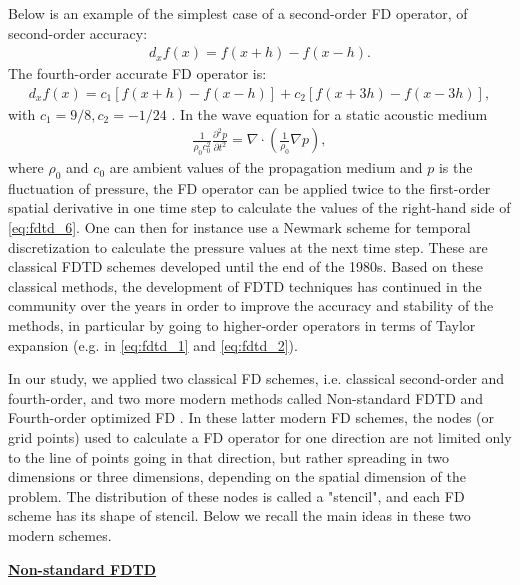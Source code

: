         Below is an example of the simplest case of a second-order FD operator, of second-order accuracy:
        \begin{align} \label{eq:fdtd_4}
             d_x f(x)=f(x+h)-f(x-h).
        \end{align}
        The fourth-order accurate FD operator is:
        \begin{align} \label{eq:fdtd_5}
             d_x f(x)=c_1 [f(x+h)-f(x-h)] + c_2 [f(x+3h)-f(x-3h)],
        \end{align}
        with $c_1=9/8, c_2=-1/24$ \parencite{Levander1988Fourthorderfinite}.
        In the wave equation for a static acoustic medium
        \begin{align} \label{eq:fdtd_6}
            \frac{1}{\rho_0 c_0^2} \frac{\partial^2 p}{\partial t^2}=\nabla \cdot (\frac{1}{\rho_0}\nabla p),
        \end{align}
        where $\rho_0$ and $c_0$ are ambient values of the propagation medium and $p$ is the fluctuation of pressure,
        the FD operator can be applied twice to the first-order spatial derivative in one time step to calculate the values of the
right-hand side of \ref{eq:fdtd_6}. One can then for instance use a Newmark scheme for temporal discretization \citep{Hug87} to calculate the pressure values at the next time step.
        These are classical FDTD schemes developed until the end of the 1980s. Based on these classical methods, the development of FDTD techniques has continued
in the community over the years in order to improve the accuracy and stability of the methods, in particular by going to higher-order operators in
terms of Taylor expansion (e.g. in \ref{eq:fdtd_1} and \ref{eq:fdtd_2}).

        In our study, we applied two classical FD schemes, i.e. classical second-order and fourth-order, and two more modern methods called Non-standard FDTD
\parencite{JafarGandomi2009NonstandardFDTD} and Fourth-order optimized FD \parencite{Bilbao2013Constructionandoptimization}. In these latter modern FD schemes,
the nodes (or grid points) used to calculate a FD operator for one direction are not limited only to the line of points going in that direction, but rather spreading in two
dimensions or three dimensions, depending on the spatial dimension of the problem.
The distribution of these nodes is called a "stencil", and each FD scheme has its shape of stencil. Below we recall the main ideas in these two modern schemes.

\noindent
        \underline{\textbf{Non-standard FDTD}}

